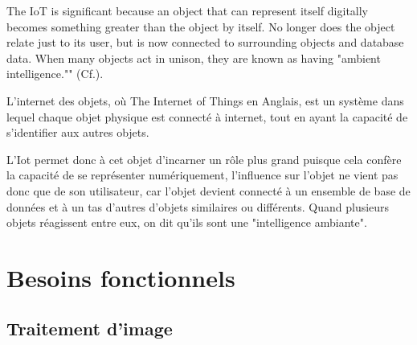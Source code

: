 \documentclass[12pt,a4paper]{article}
\begin{document}
The IoT is significant because an object that can represent itself digitally becomes something greater than the object by itself. No longer does the object relate just to its user, but is now connected to surrounding objects and database data. When many objects act in unison, they are known as having "ambient intelligence.""
(Cf.\cite{Ref27}).\par
L'internet des objets, où The Internet of Things en Anglais, est un système dans lequel chaque objet physique est connecté à internet, tout en ayant la capacité de s'identifier aux autres objets.\par
L'Iot permet donc à cet objet d'incarner un rôle plus grand puisque cela  confère la capacité de se représenter numériquement, l'influence sur l'objet ne vient pas donc que de son utilisateur, car l'objet devient connecté à un ensemble de base de données et à un tas d'autres d'objets similaires ou différents. Quand plusieurs objets réagissent entre eux, on dit qu'ils sont une "intelligence ambiante". 

\newpage
\section{Besoins fonctionnels}
\subsection{Traitement d'image}
\end{document}
